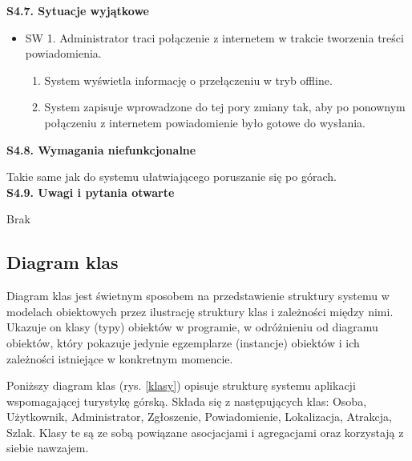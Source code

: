     \textbf{S4.7. Sytuacje wyjątkowe} \par
    \begin{itemize}
        \item []SW 1. Administrator traci połączenie z internetem w trakcie tworzenia treści powiadomienia.
        \begin{enumerate}
            \item System wyświetla informację o przełączeniu w tryb offline.
            \item System zapisuje wprowadzone do tej pory zmiany tak, aby po ponownym połączeniu z internetem powiadomienie było gotowe do wysłania.
        \end{enumerate}
    \end{itemize}
    \textbf{S4.8. Wymagania niefunkcjonalne} \par
    Takie same jak do systemu ułatwiającego poruszanie się po górach. \\
    \textbf{S4.9. Uwagi i pytania otwarte} \par
    Brak

    \subsection{Diagram klas}
    Diagram klas jest świetnym sposobem na przedstawienie struktury systemu w modelach obiektowych przez ilustrację struktury klas i zależności między nimi.
    Ukazuje on klasy (typy) obiektów w programie, w odróżnieniu od diagramu obiektów, który pokazuje jedynie egzemplarze (instancje) obiektów i ich zależności istniejące w konkretnym momencie.

    Poniższy diagram klas (rys. \ref{klasy}) opisuje strukturę systemu aplikacji wspomagającej turystykę górską. Składa się z następujących klas: Osoba, Użytkownik, Administrator, Zgłoszenie, Powiadomienie, Lokalizacja, Atrakcja, Szlak. Klasy te są ze sobą powiązane asocjacjami i agregacjami oraz korzystają z siebie nawzajem. 
    
